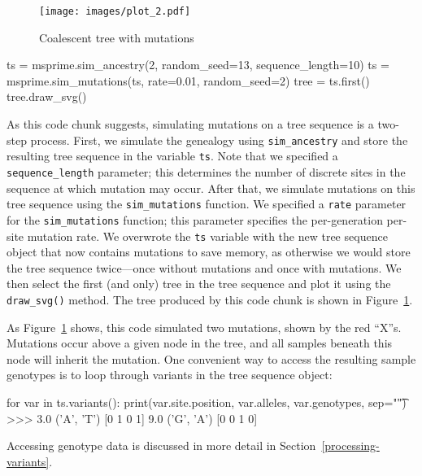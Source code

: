 \documentclass[graybox]{svmult}
\begin{document}
\begin{figure}[t]
\begin{center}
\texttt{[image: images/plot\_2.pdf]}
\end{center}
\caption{\label{fig-tree-mutations} Coalescent tree with mutations}
\end{figure}

\begin{pythoncode}
ts = msprime.sim_ancestry(2, random_seed=13, sequence_length=10)
ts = msprime.sim_mutations(ts, rate=0.01, random_seed=2)
tree = ts.first()
tree.draw_svg()
\end{pythoncode}

As this code chunk suggests, simulating mutations on a tree sequence is a two-step process.
First, we simulate the genealogy using \texttt{sim\_ancestry} and store the resulting
tree sequence in the variable \texttt{ts}. Note that we specified a \texttt{sequence\_length} parameter;
this determines the number of discrete sites in the sequence at which mutation
may occur. After that, we simulate mutations on this tree sequence using the \texttt{sim\_mutations} function.
We specified a \texttt{rate} parameter for the \texttt{sim\_mutations} function; this
parameter specifies the per-generation per-site mutation rate. We overwrote the \texttt{ts} variable
with the new tree sequence object that now contains mutations to save memory, as otherwise we would
store the tree sequence twice---once without mutations and once with mutations. We then
select the first (and only) tree in the tree sequence and plot it using the \texttt{draw\_svg()}
method. The tree produced by this code chunk is shown in Figure~\ref{fig-tree-mutations}.

As Figure~\ref{fig-tree-mutations} shows, this code simulated two mutations,
shown by the red ``X''s.
Mutations occur above a given node in the tree, and all samples beneath
this node will inherit the mutation.
One convenient way to access the resulting sample genotypes is to loop through variants in the
tree sequence object:

\begin{pythoncode}
for var in ts.variants():
    print(var.site.position, var.alleles, var.genotypes, sep="\t")
>>> 3.0	('A', 'T')	[0 1 0 1]
    9.0	('G', 'A')	[0 0 1 0]
\end{pythoncode}
Accessing genotype data is discussed in more detail in Section~\ref{processing-variants}.
\end{document}
